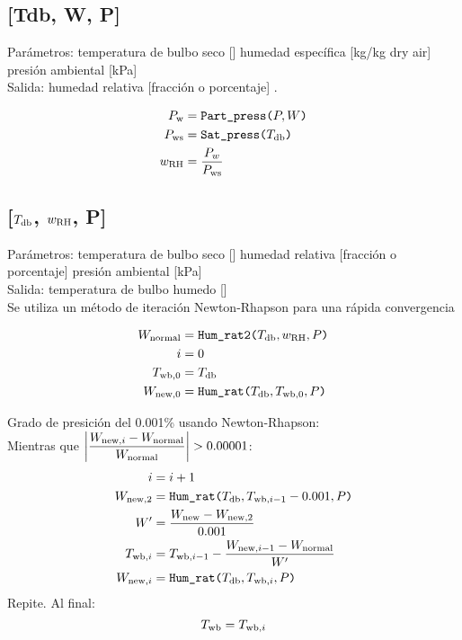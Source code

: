 \documentclass[letterpaper]{article}
\newcommand*\Tdb{\ensuremath{T\sub{db}}}
\newcommand*\Twb{\ensuremath{T\sub{wb}}}
\newcommand*\Pw{\ensuremath{P\sub{w}}}
\newcommand*\Pws{\ensuremath{P\sub{ws}}}
\newcommand*\RH{\ensuremath{w\sub{RH}}}
\begin{document}
\subsection{[Tdb, W, P]}
\noindent Parámetros:
\vardef{\Tdb}temperatura de bulbo seco [\degC]
humedad específica [kg/kg dry air]
presión ambiental [kPa]
\\Salida:
\vardef{\RH}humedad relativa [fracción o porcentaje]
\ashref.

\begin{align}
    \Pw &= \funcname{Part\_press}[P, W]\\
    \Pws &= \funcname{Sat\_press}[\Tdb]\\
    \RH &= \frac{P_w}{\Pws}
\end{align}


\subsection{[\Tdb, \RH, P]}
\noindent Parámetros:
\vardef{\Tdb}temperatura de bulbo seco [\degC]
\vardef{\RH}humedad relativa [fracción o porcentaje]
presión ambiental [kPa]
\\Salida:
\vardef{\Twb}temperatura de bulbo humedo [\degC]
\\Se utiliza un método de iteración Newton-Rhapson para una rápida convergencia

\begin{align}
    W\sub{normal} &= \funcname{Hum\_rat2}[\Tdb, \RH, P] \\
    i &= 0 \\
    T\sub[0]{wb} &= \Tdb \\
    W\sub[0]{new} &= \funcname{Hum\_rat}[\Tdb, {T\sub[0]{wb}}, P]
\end{align}
    
Grado de presición del 0.001\% usando Newton-Rhapson:
\\Mientras que $\left|\dfrac{W\sub[i]{new} - W\sub{normal}}{W\sub{normal}}\right| > 0.00001$:
\begin{align}
	i&=i+1\\
    W\sub[2]{new} &= \funcname{Hum\_rat}[\Tdb, {T\sub[i-1]{wb} - 0.001}, P] \\
    W' &= \frac{W\sub{new}-W\sub[2]{new}  }{0.001} \\
    T\sub[i]{wb} &= T\sub[i-1]{wb} - \frac{W\sub[i-1]{new}-W\sub{normal}}{W'} \\
    W\sub[i]{new} &= \funcname{Hum\_rat}[\Tdb, {T\sub[i]{wb}}, P]
\end{align}
Repite. Al final:
\begin{equation}
    \Twb = T\sub[i]{wb}
\end{equation}
\end{document}
